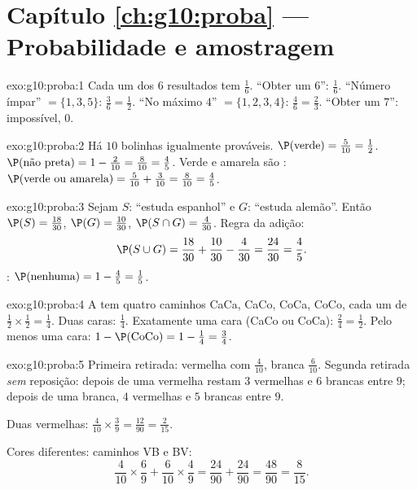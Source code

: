 \section*{Capítulo \ref{ch:g10:proba} --- Probabilidade e amostragem}

\begin{solution}{exo:g10:proba:1}
Cada um dos $6$ resultados tem  $\frac16$.
``Obter um $6$'': $\frac16$.
``Número ímpar'' $= \{1, 3, 5\}$: $\frac36 = \frac12$.
``No máximo $4$'' $= \{1,2,3,4\}$: $\frac46 = \frac23$.
``Obter um $7$'':  impossível,  $0$.
\end{solution}

\begin{solution}{exo:g10:proba:2}
Há $10$ bolinhas igualmente prováveis.
$\P(\text{verde}) = \frac{5}{10} = \frac12$.
$\P(\text{não preta}) = 1 - \frac{2}{10} = \frac{8}{10} = \frac45$.
Verde e amarela são :
$\P(\text{verde ou amarela}) = \frac{5}{10} + \frac{3}{10} =
\frac{8}{10} = \frac45$.
\end{solution}

\begin{solution}{exo:g10:proba:3}
Sejam $S$: ``estuda espanhol'' e $G$: ``estuda alemão''. Então
$\P(S) = \frac{18}{30}$, $\P(G) = \frac{10}{30}$,
$\P(S \cap G) = \frac{4}{30}$. Regra da adição:
\[
\P(S \cup G) = \frac{18}{30} + \frac{10}{30} - \frac{4}{30}
= \frac{24}{30} = \frac45 .
\]
: $\P(\text{nenhuma}) = 1 - \frac45 = \frac15$.
\end{solution}

\begin{solution}{exo:g10:proba:4}
A  tem quatro caminhos CaCa, CaCo, CoCa, CoCo, cada um de
 $\frac12 \times \frac12 = \frac14$.
Duas caras: $\frac14$. Exatamente uma cara (CaCo ou CoCa):
$\frac24 = \frac12$. Pelo menos uma cara:
$1 - \P(\text{CoCo}) = 1 - \frac14 = \frac34$.
\end{solution}

\begin{solution}{exo:g10:proba:5}
Primeira retirada: vermelha com  $\frac{4}{10}$, branca
$\frac{6}{10}$. Segunda retirada \emph{sem} reposição: depois de uma
vermelha restam $3$ vermelhas e $6$ brancas entre $9$; depois de uma
branca, $4$ vermelhas e $5$ brancas entre $9$.

Duas vermelhas:
$\frac{4}{10} \times \frac39 = \frac{12}{90} = \frac{2}{15}$.

Cores diferentes: caminhos VB e BV:
\[
\frac{4}{10} \times \frac69 + \frac{6}{10} \times \frac49
= \frac{24}{90} + \frac{24}{90} = \frac{48}{90} = \frac{8}{15}.
\]
\end{solution}

